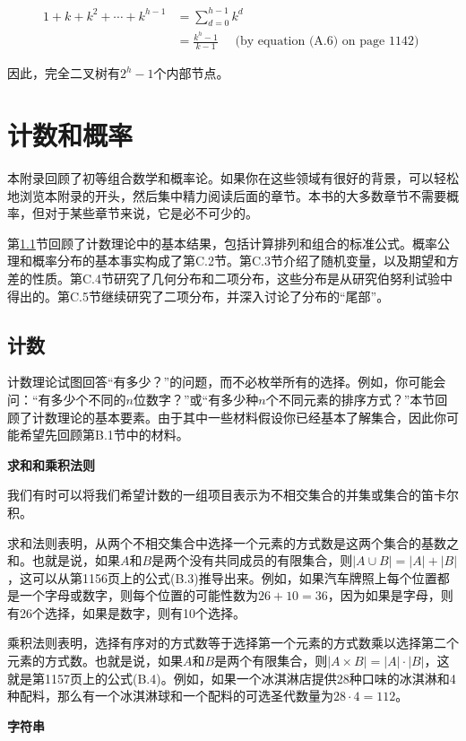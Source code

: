 \documentclass[lang=cn,newtx,10pt,scheme=chinese]{elegantbook}
\begin{document}
$$
\begin{aligned}
1+k+k^2+\cdots+k^{h-1} & =\sum_{d=0}^{h-1} k^d \\
& =\frac{k^h-1}{k-1} \quad \text { (by equation (A.6) on page 1142) }
\end{aligned}
$$

因此，完全二叉树有$2^h-1$个内部节点。

\chapter{计数和概率}

本附录回顾了初等组合数学和概率论。如果你在这些领域有很好的背景，可以轻松地浏览本附录的开头，然后集中精力阅读后面的章节。本书的大多数章节不需要概率，但对于某些章节来说，它是必不可少的。

第\ref{section:C.1}节回顾了计数理论中的基本结果，包括计算排列和组合的标准公式。概率公理和概率分布的基本事实构成了第C.2节。第C.3节介绍了随机变量，以及期望和方差的性质。第C.4节研究了几何分布和二项分布，这些分布是从研究伯努利试验中得出的。第C.5节继续研究了二项分布，并深入讨论了分布的“尾部”。

\section{计数}\label{section:C.1}

计数理论试图回答“有多少？”的问题，而不必枚举所有的选择。例如，你可能会问：“有多少个不同的$n$位数字？”或“有多少种$n$个不同元素的排序方式？”本节回顾了计数理论的基本要素。由于其中一些材料假设你已经基本了解集合，因此你可能希望先回顾第B.1节中的材料。

\textbf{求和和乘积法则}

我们有时可以将我们希望计数的一组项目表示为不相交集合的并集或集合的笛卡尔积。

求和法则表明，从两个不相交集合中选择一个元素的方式数是这两个集合的基数之和。也就是说，如果$A$和$B$是两个没有共同成员的有限集合，则$|A\cup B|=|A|+|B|$，这可以从第1156页上的公式(B.3)推导出来。例如，如果汽车牌照上每个位置都是一个字母或数字，则每个位置的可能性数为$26+10=36$，因为如果是字母，则有26个选择，如果是数字，则有10个选择。

乘积法则表明，选择有序对的方式数等于选择第一个元素的方式数乘以选择第二个元素的方式数。也就是说，如果$A$和$B$是两个有限集合，则$|A\times B|=|A|\cdot |B|$，这就是第1157页上的公式(B.4)。例如，如果一个冰淇淋店提供28种口味的冰淇淋和4种配料，那么有一个冰淇淋球和一个配料的可选圣代数量为$28\cdot 4=112$。

\textbf{字符串}
\end{document}
